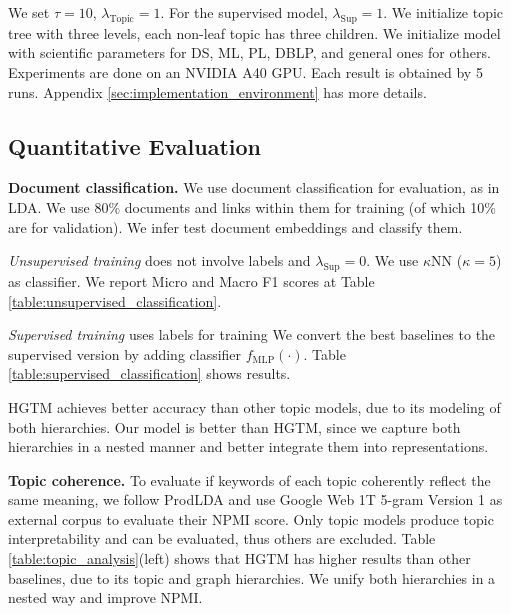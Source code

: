 We set $ \tau=10 $, $ \lambda_{\text{Topic}}=1 $. For the supervised model, $ \lambda_{\text{Sup}}=1 $. %
We initialize topic tree with three levels, each non-leaf topic has three children. We initialize model with scientific parameters \cite{scibert} for DS, ML, PL, DBLP, and general ones \cite{bert} for others. Experiments are done on an NVIDIA A40 GPU. Each result is obtained by 5 runs. %
Appendix \ref{sec:implementation_environment} has more details.

\subsection{Quantitative Evaluation}

\textbf{Document classification.} We use document classification for evaluation, as in LDA. We use 80\% documents and links within them for training (of which 10\% are for validation). We infer test document embeddings and classify them. %

\emph{Unsupervised training} does not involve labels and $ \lambda_{\text{Sup}}=0 $. We %
use $ \kappa $NN ($ \kappa=5 $) as classifier. We report Micro and Macro F1 scores at Table \ref{table:unsupervised_classification}.

\emph{Supervised training} uses labels for training %
We convert the best baselines to the supervised version by adding classifier $ f_{\text{MLP}}(\cdot) $. Table \ref{table:supervised_classification} shows results.

HGTM achieves better accuracy than other topic models, due to its modeling of both hierarchies. Our model is better than HGTM, since we capture both hierarchies in a nested manner and better integrate them into representations.


\textbf{Topic coherence.} %
To evaluate if keywords of each topic coherently reflect the same meaning, we follow ProdLDA and use Google Web 1T 5-gram Version 1 \cite{google_5gram} as external corpus to evaluate their NPMI score. Only topic models produce topic interpretability and can be evaluated, thus others are excluded. Table \ref{table:topic_analysis}(left) shows that %
HGTM has higher results than other baselines, due to its topic and graph hierarchies. We unify both hierarchies in a nested way and improve NPMI.

